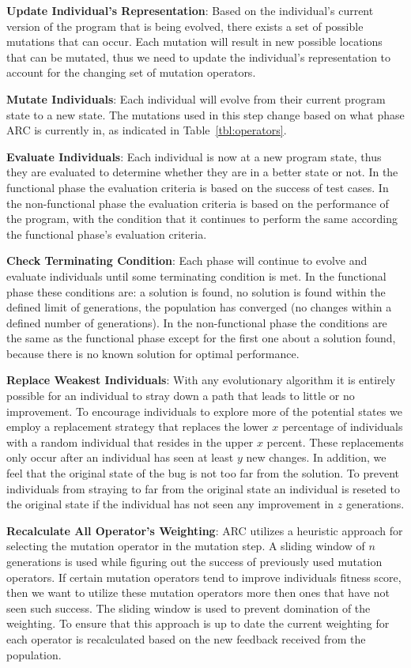 \documentclass[10pt, conference, compsocconf]{IEEEtran}
\begin{document}
\textbf{Update Individual's Representation}: Based on the individual's current
version of the program that is being evolved, there exists a set of possible
mutations that can occur. Each mutation will result in new possible locations
that can be mutated, thus we need to update the individual's representation to
account for the changing set of mutation operators.

\textbf{Mutate Individuals}: Each individual will evolve from their current
program state to a new state. The mutations used in this step change based on
what phase ARC is currently in, as indicated in Table~\ref{tbl:operators}.

\textbf{Evaluate Individuals}: Each individual is now at a new program state,
thus they are evaluated to determine whether they are in a better state or not.
In the functional phase the evaluation criteria is based on the success of test
cases. In the non-functional phase the evaluation criteria is based on the
performance of the program, with the condition that it continues to perform the
same according the functional phase's evaluation criteria.

\textbf{Check Terminating Condition}: Each phase will continue to evolve and
evaluate individuals until some terminating condition is met. In the functional
phase these conditions are: a solution is found, no solution is found within
the defined limit of generations, the population has converged (no changes
within a defined number of generations). In the non-functional phase the
conditions are the same as the functional phase except for the first one about
a solution found, because there is no known solution for optimal performance.

\textbf{Replace Weakest Individuals}: With any evolutionary algorithm it is
entirely possible for an individual to stray down a path that leads to little
or no improvement. To encourage individuals to explore more of the potential
states we employ a replacement strategy that replaces the lower $x$ percentage
of individuals with a random individual that resides in the upper $x$ percent.
These replacements only occur after an individual has seen at least $y$ new
changes. In addition, we feel that the original state of the bug is not too far
from the solution. To prevent individuals from straying to far from the
original state an individual is reseted to the original state if the individual
has not seen any improvement in $z$ generations.

\textbf{Recalculate All Operator's Weighting}: ARC utilizes a heuristic
approach for selecting the mutation operator in the mutation step. A sliding
window of $n$ generations is used while figuring out the success of previously
used mutation operators. If certain mutation operators tend to improve
individuals fitness score, then we want to utilize these mutation operators
more then ones that have not seen such success. The sliding window is used to
prevent domination of the weighting. To ensure that this approach is up to date
the current weighting for each operator is recalculated based on the new
feedback received from the population.
\end{document}
